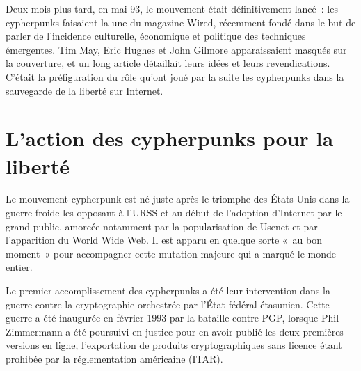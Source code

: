 Deux mois plus tard, en mai 93, le mouvement était définitivement lancé~: les cypherpunks faisaient la une du magazine Wired, récemment fondé dans le but de parler de l'incidence culturelle, économique et politique des techniques émergentes. Tim May, Eric Hughes et John Gilmore apparaissaient masqués sur la couverture, et un long article détaillait leurs idées et leurs revendications. C'était la préfiguration du rôle qu'ont joué par la suite les cypherpunks dans la sauvegarde de la liberté sur Internet. %

\vspace{-1em}
\section*{L'action des cypherpunks pour la liberté} %

Le mouvement cypherpunk est né juste après le triomphe des États-Unis dans la guerre froide les opposant à l'URSS et au début de l'adoption d'Internet par le grand public, amorcée notamment par la popularisation de Usenet et par l'apparition du World Wide Web. Il est apparu en quelque sorte «~au bon moment~» pour accompagner cette mutation majeure qui a marqué le monde entier.


Le premier accomplissement des cypherpunks a été leur intervention dans la guerre contre la cryptographie orchestrée par l'État fédéral étasunien. Cette guerre a été inaugurée en février 1993 par la bataille contre PGP, lorsque Phil Zimmermann a été poursuivi en justice pour en avoir publié les deux premières versions en ligne, l'exportation de produits cryptographiques sans licence étant prohibée par la réglementation américaine (ITAR).

%

